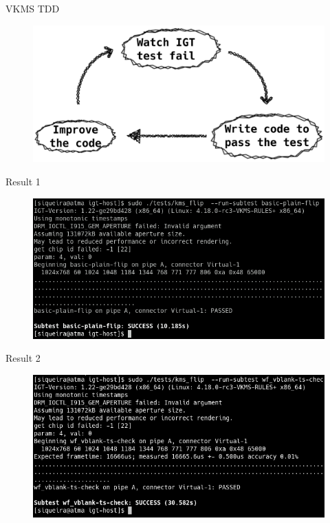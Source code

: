 \documentclass[10pt, compress, aspectratio=169]{beamer}
\begin{document}
\begin{frame}{VKMS TDD}
  \begin{figure}
    \centering
    \includegraphics[width=\linewidth,
                     height=0.8\textheight,
                     keepaspectratio]{tdd-drm}
  \end{figure}
\end{frame}

\begin{frame}{Result 1}
  \begin{figure}
    \centering
    \includegraphics[width=\linewidth,
                     height=0.8\textheight,
                     keepaspectratio]{basic-plain-flip_passing}
  \end{figure}
\end{frame}

\begin{frame}{Result 2}
  \begin{figure}
    \centering
    \includegraphics[width=\linewidth,
                     height=0.8\textheight,
                     keepaspectratio]{wf_vblank-ts-check}
  \end{figure}
\end{frame}
\end{document}
